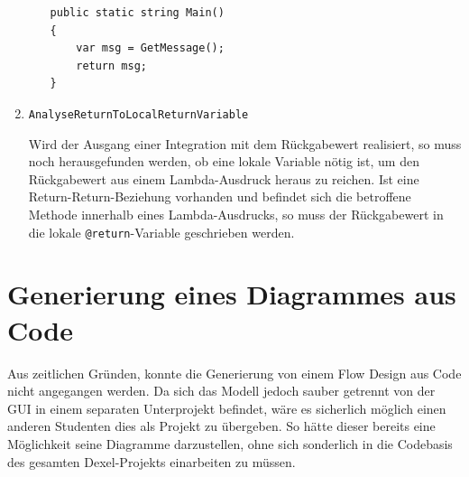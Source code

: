 \begin{enumerate}
\begin{itemize}
\begin{lstlisting}[caption=Return-Return-Beziehung]
public static string Main()
{
	var msg = GetMessage();
	return msg;
}
\end{lstlisting}		    
		    
		\end{itemize}
			\item \texttt{AnalyseReturnToLocalReturnVariable}
			
			Wird der Ausgang einer Integration mit dem Rückgabewert realisiert, so muss noch herausgefunden werden, ob eine lokale Variable nötig ist, um den Rückgabewert aus einem Lambda-Ausdruck heraus zu reichen. Ist eine Return-Return-Beziehung vorhanden und befindet sich die betroffene Methode innerhalb eines Lambda-Ausdrucks, so muss der Rückgabewert in die lokale \texttt{@return}-Variable geschrieben werden.
	\end{enumerate}
	



\section{Generierung eines Diagrammes aus Code}

Aus zeitlichen Gründen, konnte die Generierung von einem Flow Design aus Code nicht angegangen werden. 
Da sich das Modell jedoch sauber getrennt von der GUI in
einem separaten Unterprojekt befindet, wäre es sicherlich möglich einen anderen
Studenten dies als Projekt zu übergeben. So hätte dieser bereits eine
Möglichkeit seine Diagramme darzustellen, ohne sich sonderlich in die
Codebasis des gesamten Dexel-Projekts einarbeiten zu müssen.
